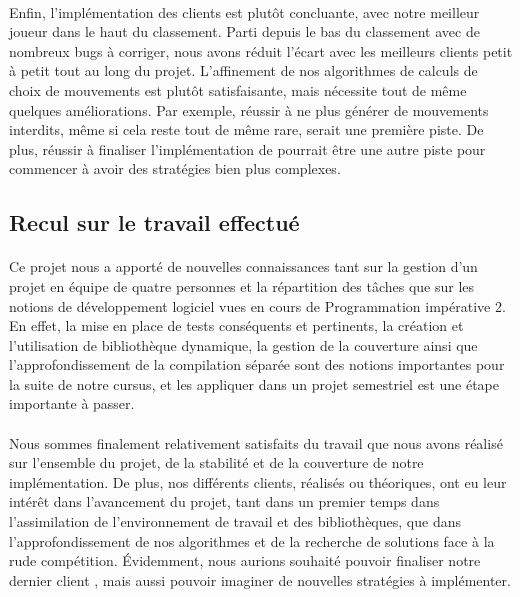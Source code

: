 \documentclass[a4paper]{article}
\begin{document}
\paragraph{}
Enfin, l'implémentation des clients est plutôt concluante, avec notre meilleur joueur  dans le haut du classement. Parti depuis le bas du classement avec de nombreux bugs à corriger, nous avons réduit l'écart avec les meilleurs clients petit à petit tout au long du projet. L'affinement de nos algorithmes de calculs de choix de mouvements est plutôt satisfaisante, mais nécessite tout de même quelques améliorations. Par exemple, réussir à ne plus générer de mouvements interdits, même si cela reste tout de même rare, serait une première piste.  De plus, réussir à finaliser l'implémentation de  pourrait être une autre piste pour commencer à avoir des stratégies bien plus complexes.

\subsection{Recul sur le travail effectué}
\paragraph{}
Ce projet nous a apporté de nouvelles connaissances tant sur la gestion d'un projet en équipe de quatre personnes et la répartition des tâches que sur les notions de développement logiciel vues en cours de Programmation impérative 2. En effet, la mise en place de tests conséquents et pertinents, la création et l'utilisation de bibliothèque dynamique, la gestion de la couverture ainsi que l'approfondissement de la compilation séparée sont des notions importantes pour la suite de notre cursus, et les appliquer dans un projet semestriel est une étape importante à passer.

\paragraph{}
Nous sommes finalement relativement satisfaits du travail que nous avons réalisé sur l'ensemble du projet, de la stabilité et de la couverture de notre implémentation. De plus, nos différents clients, réalisés ou théoriques, ont eu leur intérêt dans l'avancement du projet, tant dans un premier temps dans l'assimilation de l'environnement de travail et des bibliothèques, que dans l'approfondissement de nos algorithmes et de la recherche de solutions face à la rude compétition. Évidemment, nous aurions souhaité pouvoir finaliser notre dernier client , mais aussi pouvoir imaginer de nouvelles stratégies à implémenter.



\end{document}
